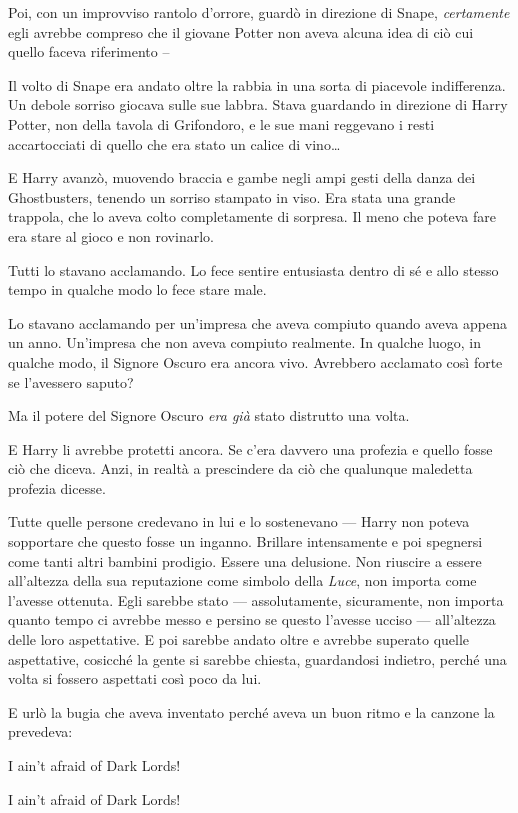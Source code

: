 Poi, con un improvviso rantolo d’orrore, guardò in direzione di Snape, \textit{certamente} egli avrebbe compreso che il giovane Potter non aveva alcuna idea di ciò cui quello faceva riferimento –

Il volto di Snape era andato oltre la rabbia in una sorta di piacevole indifferenza. Un debole sorriso giocava sulle sue labbra. Stava guardando in direzione di Harry Potter, non della tavola di Grifondoro, e le sue mani reggevano i resti accartocciati di quello che era stato un calice di vino…

E Harry avanzò, muovendo braccia e gambe negli ampi gesti della danza dei Ghostbusters, tenendo un sorriso stampato in viso. Era stata una grande trappola, che lo aveva colto completamente di sorpresa. Il meno che poteva fare era stare al gioco e non rovinarlo.

Tutti lo stavano acclamando. Lo fece sentire entusiasta dentro di sé e allo stesso tempo in qualche modo lo fece stare male.

Lo stavano acclamando per un’impresa che aveva compiuto quando aveva appena un anno. Un’impresa che non aveva compiuto realmente. In qualche luogo, in qualche modo, il Signore Oscuro era ancora vivo. Avrebbero acclamato così forte se l’avessero saputo?

Ma il potere del Signore Oscuro \textit{era già} stato distrutto una volta.

E Harry li avrebbe protetti ancora. Se c’era davvero una profezia e quello fosse ciò che diceva. Anzi, in realtà a prescindere da ciò che qualunque maledetta profezia dicesse.

Tutte quelle persone credevano in lui e lo sostenevano — Harry non poteva sopportare che questo fosse un inganno. Brillare intensamente e poi spegnersi come tanti altri bambini prodigio. Essere una delusione. Non riuscire a essere all’altezza della sua reputazione come simbolo della \textit{Luce}, non importa come l’avesse ottenuta. Egli sarebbe stato — assolutamente, sicuramente, non importa quanto tempo ci avrebbe messo e persino se questo l’avesse ucciso — all’altezza delle loro aspettative. E poi sarebbe andato oltre e avrebbe superato quelle aspettative, cosicché la gente si sarebbe chiesta, guardandosi indietro, perché una volta si fossero aspettati così poco da lui.

E urlò la bugia che aveva inventato perché aveva un buon ritmo e la canzone la prevedeva:

\begin{center}
\begin{itpars}
I ain’t afraid of Dark Lords!

\vspace{0.8em}

I ain’t afraid of Dark Lords!
\end{itpars}
\end{center}

